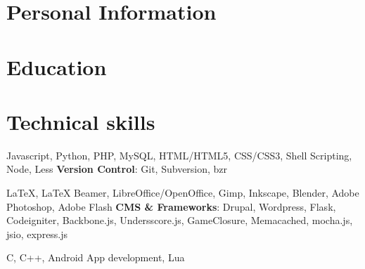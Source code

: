\documentclass[11pt,a4paper]{moderncv}
\begin{document}
\maketitle


\section {Personal Information}

\section{Education}

\section{Technical skills}
           {Javascript, Python, PHP, MySQL, HTML/HTML5, CSS/CSS3, Shell Scripting, Node, Less}
           {\textbf{Version Control}: }
           {Git, Subversion, bzr}

           {{\LaTeX}, {\LaTeX} Beamer, LibreOffice/OpenOffice, Gimp, Inkscape, Blender, Adobe Photoshop, Adobe Flash}
           {\textbf{CMS \& Frameworks}: }
           {Drupal, Wordpress, Flask, Codeigniter, Backbone.js, Undersscore.js, GameClosure, Memacached, mocha.js, jsio, express.js}

           {C, C++, Android App development, Lua}{}{}


\end{document}
